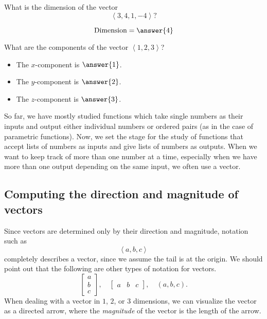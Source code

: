 \documentclass{ximera}
\begin{document}
\begin{question}
  What is the dimension of the vector 
  \[
  \left\langle 3,4,1,-4 \right\rangle?
  \]
  \begin{prompt}
  \[
  \text{Dimension} = \answer{4}
  \]
  \end{prompt}
  \begin{question}
    What are the components of the vector $\left\langle 1,2,3 \right\rangle$?
    \begin{prompt}
      \begin{itemize}
      \item The $x$-component is $\answer{1}$.
      \item The $y$-component is $\answer{2}$.
      \item The $z$-component is $\answer{3}$.
      \end{itemize}
    \end{prompt}
  \end{question}
\end{question}


So far, we have mostly studied functions which take single numbers as
their inputs and output either individual numbers or ordered pairs (as
in the case of parametric functions).  Now, we set the stage for the
study of functions that accept lists of numbers as inputs and give lists of
numbers as outputs. When we want to keep track of more than one number
at a time, especially when we have more than one output depending on the 
same input, we often use a vector.





\subsection{Computing the direction and magnitude of vectors}


Since vectors are determined only by their direction and magnitude,
notation such as
\[
\left\langle a,b,c \right\rangle
\]
completely describes a vector, since we assume the tail is at the
origin. We should point out that the following are other types of notation for vectors.
\[
\begin{bmatrix}
  a\\
  b\\
  c
\end{bmatrix}, \quad
\begin{bmatrix}
  a & b & c
\end{bmatrix},
\quad
(a,b,c).
\]
When dealing with a vector in $1$, $2$, or $3$ dimensions, we can
visualize the vector as a directed arrow, where the \textit{magnitude} of the vector 
is the length of the arrow.
\end{document}
